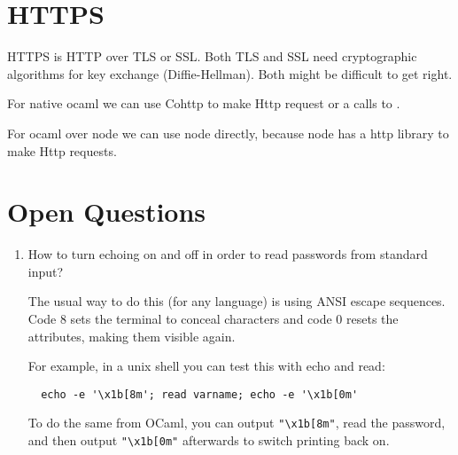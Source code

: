 \section{HTTPS}

HTTPS is HTTP over TLS or SSL. Both TLS and SSL need cryptographic algorithms
for key exchange (Diffie-Hellman). Both might be difficult to get right.

For native ocaml we can use Cohttp to make Http request or a calls to
.

For ocaml over node we can use node directly, because node has a http library
to make Http requests.


\section{Open Questions}

\begin{enumerate}
\item How to turn echoing on and off in order to read passwords from standard
  input?

  The usual way to do this (for any language) is using ANSI escape
  sequences. Code 8 sets the terminal to conceal characters and code 0 resets
  the attributes, making them visible again.

  For example, in a unix shell you can test this with echo and read:
  \begin{verbatim}
  echo -e '\x1b[8m'; read varname; echo -e '\x1b[0m'
  \end{verbatim}
  To do the same from OCaml, you can output \verb|"\x1b[8m"|, read the
  password, and then output \verb|"\x1b[0m"| afterwards to switch printing
  back on.

\end{enumerate}
